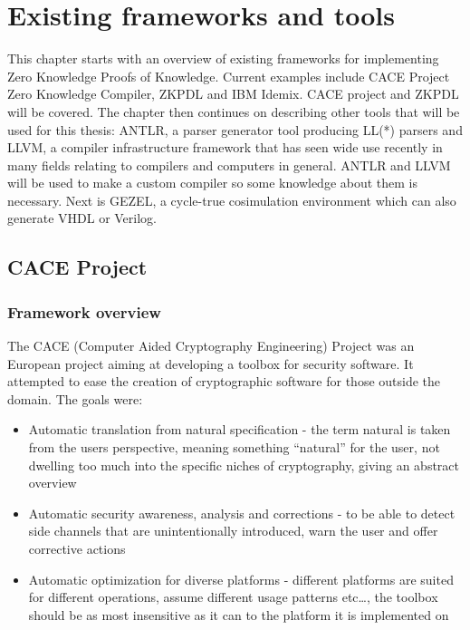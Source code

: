 \chapter{Existing frameworks and tools}

This chapter starts with an overview of existing frameworks for
implementing Zero Knowledge Proofs of Knowledge. Current examples
include CACE Project Zero Knowledge Compiler, ZKPDL and IBM
Idemix. CACE project and ZKPDL will be covered. The chapter then
continues on describing other tools that will be used for this thesis:
ANTLR, a parser generator tool producing LL(*) parsers and LLVM, a
compiler infrastructure framework that has seen wide use recently in
many fields relating to compilers and computers in general. ANTLR and
LLVM will be used to make a custom compiler so some knowledge about
them is necessary. Next is GEZEL, a cycle-true cosimulation
environment which can also generate VHDL or Verilog.

\section{CACE Project}

\subsection{Framework overview}

The CACE (Computer Aided Cryptography Engineering) Project was an
European project aiming at developing a toolbox for security
software. It attempted to ease the creation of cryptographic software
for those outside the domain. The goals were:
\begin{itemize}
\item Automatic translation from natural specification - the
  term natural is taken from the users perspective, meaning something
  ``natural'' for the user, not dwelling too much into the specific
  niches of cryptography, giving an abstract overview
\item Automatic security awareness, analysis and corrections - to be
  able to detect side channels that are unintentionally introduced,
  warn the user and offer corrective actions
\item Automatic optimization for diverse platforms - different
  platforms are suited for different operations, assume different
  usage patterns etc\ldots, the toolbox should be as most insensitive
  as it can to the platform it is implemented on
\end{itemize}


